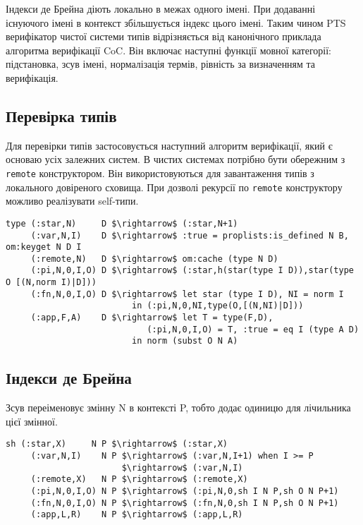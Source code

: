 Індекси де Брейна діють локально в межах одного імені.
При додаванні існуючого імені в контекст збільшується індекс цього імені.
Таким чином PTS верифікатор чистої системи типів відрізняється від
канонічного приклада алгоритма верифікації CoC\cite{Coq88}. Він включає
наступні функції мовної категорії: підстановка,
зсув імені, нормалізація термів, рівність
за визначенням та верифікація.

\subsection*{Перевірка типів}
Для перевірки типів застосовується наступний алгоритм верифікації, який є основаю
усіх залежних систем. В чистих системах потрібно бути обережним з \lstinline{remote}
конструктором. Він використовуються для завантаження типів з локального довіреного сховища.
При дозволі рекурсії по \lstinline{remote} конструктору можливо реалізувати
self-типи\cite{Stump17}\cite{Fu14}.

\begin{lstlisting}[mathescape=true]
type (:star,N)     D $\rightarrow$ (:star,N+1)
     (:var,N,I)    D $\rightarrow$ :true = proplists:is_defined N B, om:keyget N D I
     (:remote,N)   D $\rightarrow$ om:cache (type N D)
     (:pi,N,0,I,O) D $\rightarrow$ (:star,h(star(type I D)),star(type O [(N,norm I)|D]))
     (:fn,N,0,I,O) D $\rightarrow$ let star (type I D), NI = norm I
                         in (:pi,N,0,NI,type(O,[(N,NI)|D]))
     (:app,F,A)    D $\rightarrow$ let T = type(F,D),
                            (:pi,N,0,I,O) = T, :true = eq I (type A D)
                         in norm (subst O N A)
\end{lstlisting}

\subsection*{Індекси де Брейна}
Зсув переіменовує змінну N в контексті P, тобто додає одиницю для лічильника цієї змінної.

\begin{lstlisting}[mathescape=true]
  sh (:star,X)     N P $\rightarrow$ (:star,X)
     (:var,N,I)    N P $\rightarrow$ (:var,N,I+1) when I >= P
                       $\rightarrow$ (:var,N,I)
     (:remote,X)   N P $\rightarrow$ (:remote,X)
     (:pi,N,0,I,O) N P $\rightarrow$ (:pi,N,0,sh I N P,sh O N P+1)
     (:fn,N,0,I,O) N P $\rightarrow$ (:fn,N,0,sh I N P,sh O N P+1)
     (:app,L,R)    N P $\rightarrow$ (:app,L,R)
\end{lstlisting}

